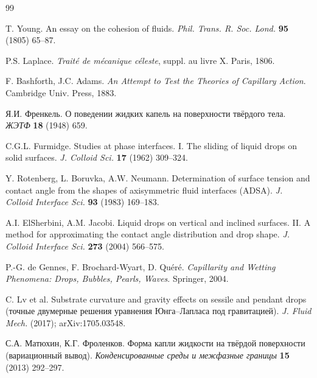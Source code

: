 \documentclass[11pt]{article}
\theoremstyle{definition}
\begin{document}
\begin{thebibliography}{99}

 T. Young.
An essay on the cohesion of fluids.
\textit{Phil. Trans. R. Soc. Lond.} \textbf{95} (1805) 65--87.

 P.S. Laplace.
\textit{Traité de mécanique céleste}, suppl. au livre X. Paris, 1806.

 F. Bashforth, J.C. Adams.
\textit{An Attempt to Test the Theories of Capillary Action}.
Cambridge Univ. Press, 1883.

 Я.И. Френкель.
О поведении жидких капель на поверхности твёрдого тела.
\textit{ЖЭТФ} \textbf{18} (1948) 659.

 C.G.L. Furmidge.
Studies at phase interfaces. I. The sliding of liquid drops on solid surfaces.
\textit{J. Colloid Sci.} \textbf{17} (1962) 309--324.

 Y. Rotenberg, L. Boruvka, A.W. Neumann.
Determination of surface tension and contact angle from the shapes of
axisymmetric fluid interfaces (ADSA).
\textit{J. Colloid Interface Sci.} \textbf{93} (1983) 169--183.

 A.I. ElSherbini, A.M. Jacobi.
Liquid drops on vertical and inclined surfaces. II. A method for approximating
the contact angle distribution and drop shape.
\textit{J. Colloid Interface Sci.} \textbf{273} (2004) 566--575.

 P.-G. de Gennes, F. Brochard-Wyart, D. Quéré.
\textit{Capillarity and Wetting Phenomena: Drops, Bubbles, Pearls, Waves}.
Springer, 2004.

 C. Lv et al.
Substrate curvature and gravity effects on sessile and pendant drops
(точные двумерные решения уравнения Юнга--Лапласа под гравитацией).
\textit{J. Fluid Mech.} (2017); arXiv:1705.03548.

 С.А. Матюхин, К.Г. Фроленков.
Форма капли жидкости на твёрдой поверхности (вариационный вывод).
\textit{Конденсированные среды и межфазные границы} \textbf{15} (2013) 292--297.

\end{thebibliography}
\end{document}
